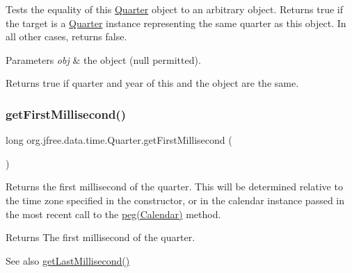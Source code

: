 Tests the equality of this \mbox{\hyperlink{classorg_1_1jfree_1_1data_1_1time_1_1_quarter}{Quarter}} object to an arbitrary object. Returns {\ttfamily true} if the target is a \mbox{\hyperlink{classorg_1_1jfree_1_1data_1_1time_1_1_quarter}{Quarter}} instance representing the same quarter as this object. In all other cases, returns {\ttfamily false}.


\begin{DoxyParams}{Parameters}
{\em obj} & the object ({\ttfamily null} permitted).\\
\hline
\end{DoxyParams}
\begin{DoxyReturn}{Returns}
{\ttfamily true} if quarter and year of this and the object are the same. 
\end{DoxyReturn}
\mbox{\label{classorg_1_1jfree_1_1data_1_1time_1_1_quarter_a64b9346c7db660f54793093a3d496a7c}} 
\subsubsection{\texorpdfstring{get\+First\+Millisecond()}{getFirstMillisecond()}\hspace{0.1cm}{\footnotesize\ttfamily [1/2]}}
{\footnotesize\ttfamily long org.\+jfree.\+data.\+time.\+Quarter.\+get\+First\+Millisecond (\begin{DoxyParamCaption}{ }\end{DoxyParamCaption})}

Returns the first millisecond of the quarter. This will be determined relative to the time zone specified in the constructor, or in the calendar instance passed in the most recent call to the \mbox{\hyperlink{classorg_1_1jfree_1_1data_1_1time_1_1_quarter_a4977c326e2990b40052d09d935f11ce8}{peg(\+Calendar)}} method.

\begin{DoxyReturn}{Returns}
The first millisecond of the quarter.
\end{DoxyReturn}
\begin{DoxySeeAlso}{See also}
\mbox{\hyperlink{classorg_1_1jfree_1_1data_1_1time_1_1_quarter_afa9df1dbf9d13ab199ad78d6cc222f62}{get\+Last\+Millisecond()}} 
\end{DoxySeeAlso}
\mbox{\label{classorg_1_1jfree_1_1data_1_1time_1_1_quarter_a14ab5d2abc2e777c3d5eb0f483a83f29}} 
